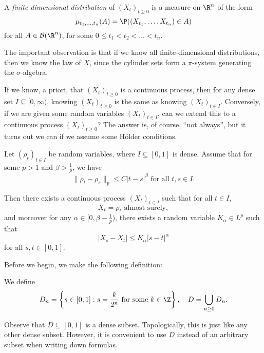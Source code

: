 \documentclass[a4paper]{article}
\begin{document}
\begin{defi}
  A \emph{finite dimensional distribution} of $(X_t)_{t \geq 0}$ is a measure on $\R^n$ of the form
  \[
    \mu_{t_1, \ldots, t_n}(A) = \P((X_{t_1}, \ldots, X_{t_n}) \in A)
  \]
  for all $A \in \mathcal{B}(\R^n)$, for some $0 \leq t_1 < t_2 < \ldots < t_n$.
\end{defi}

The important observation is that if we know all finite-dimensional distributions, then we know the law of $X$, since the cylinder sets form a $\pi$-system generating the $\sigma$-algebra.

If we know, a priori, that $(X_t)_{t \geq 0}$ is a continuous process, then for any dense set $I \subseteq [0, \infty)$, knowing $(X_t)_{t \geq 0}$ is the same as knowing $(X_t)_{t \in I}$. Conversely, if we are given some random variables $(X_t)_{t \in I}$, can we extend this to a continuous process $(X_t)_{t \geq 0}$? The answer is, of course, ``not always'', but it turns out we can if we assume some H\"older conditions.

\begin{thm}
  Let $(\rho_t)_{t \in I}$ be random variables, where $I \subseteq [0, 1]$ is dense. Assume that for some $p > 1$ and $\beta > \frac{1}{p}$, we have
  \[
    \|\rho_t - \rho_s\|_p \leq C |t - s|^\beta\text{ for all }t, s \in I.\tag{$*$}
  \]

  Then there exists a continuous process $(X_t)_{t \in I}$ such that for all $t \in I$,
  \[
    X_t = \rho_t \text{ almost surely},
  \]
  and moreover for any $\alpha \in [0, \beta - \frac{1}{p})$, there exists a random variable $K_\alpha \in L^p$ such that
  \[
    |X_s - X_t| \leq K_\alpha |s - t|^\alpha
  \]
  for all $s, t \in [0, 1]$.
\end{thm}

Before we begin, we make the following definition:
\begin{defi}
  We define
  \[
    D_n = \left\{s \in [0, 1] : s = \frac{k}{2^n}\text{ for some }k \in \Z\right\},\quad D = \bigcup_{n \geq 0}D_n.
  \]
\end{defi}
Observe that $D \subseteq [0, 1]$ is a dense subset. Topologically, this is just like any other dense subset. However, it is convenient to use $D$ instead of an arbitrary subset when writing down formulas.
\end{document}
